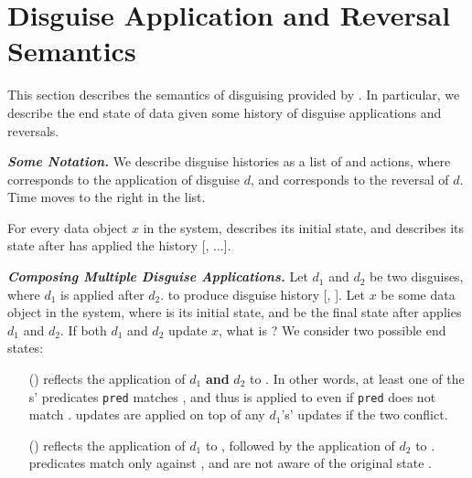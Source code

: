 \section{Disguise Application and Reversal Semantics}
\label{sec:comp}
This section describes the semantics of disguising provided by \sys. In particular, we describe the
end state of data given some history of disguise applications and reversals.

\vspace{6pt}\noindent\textbf{\emph{Some Notation.}}
We describe disguise histories as a list of  and  actions, where  corresponds
to the application of disguise $d$, and  corresponds to the reversal of $d$. Time moves to
the right in the list.

For every data object $x$ in the system, \xstart describes its initial state, and
 describes its state after \sys has applied the history [,
$\dots$].


\vspace{6pt}\noindent\textbf{\emph{Composing Multiple Disguise Applications.}}
Let $d_1$ and $d_2$ be two disguises, where $d_1$ is applied after $d_2$.
to produce disguise history [, ]. 
%
Let $x$ be some data object in the system, where \xstart is its initial state, and
 be the final state after \sys applies $d_1$ and $d_2$.
%
If both $d_1$ and $d_2$ update $x$, what is ?
We consider two possible end states: 
%
\begin{enumerate}
\item[(\appcompone)]  reflects the application of $d_1$ \textbf{and} $d_2$ to \xstart. In other
words, at least one of the s' predicates \texttt{pred} matches \xstart, and thus  is
applied to \xhist[\app{d_1}] even if \texttt{pred} does not match \xhist[\app{d_1}]. 
 updates are applied on top of any $d_1$'s' updates if the two conflict.

\item[(\appcomptwo)]  reflects the application of $d_1$ to \xstart, followed
by the application of $d_2$ to \xhist{[\app{d_1}]}.  predicates match only against
\xhist{[\app{d_1}]}, and are not aware of the original state \xstart.
\end{enumerate}

